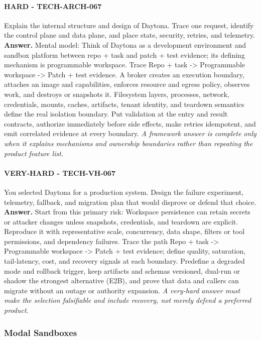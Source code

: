 \paragraph{HARD - TECH-ARCH-067} Explain the internal structure and design of Daytona. Trace one request, identify the control plane and data plane, and place state, security, retries, and telemetry.
\textbf{Answer.} Mental model: Think of Daytona as a development environment and sandbox platform between repo + task and patch + test evidence; its defining mechanism is programmable workspace. Trace Repo + task -> Programmable workspace -> Patch + test evidence. A broker creates an execution boundary, attaches an image and capabilities, enforces resource and egress policy, observes work, and destroys or snapshots it. Filesystem layers, processes, network, credentials, mounts, caches, artifacts, tenant identity, and teardown semantics define the real isolation boundary. Put validation at the entry and result contracts, authorize immediately before side effects, make retries idempotent, and emit correlated evidence at every boundary.
\textit{A framework answer is complete only when it explains mechanisms and ownership boundaries rather than repeating the product feature list.}
\paragraph{VERY-HARD - TECH-VH-067} You selected Daytona for a production system. Design the failure experiment, telemetry, fallback, and migration plan that would disprove or defend that choice.
\textbf{Answer.} Start from this primary risk: Workspace persistence can retain secrets or attacker changes unless snapshots, credentials, and teardown are explicit. Reproduce it with representative scale, concurrency, data shape, filters or tool permissions, and dependency failures. Trace the path Repo + task -> Programmable workspace -> Patch + test evidence; define quality, saturation, tail-latency, cost, and recovery signals at each boundary. Predefine a degraded mode and rollback trigger, keep artifacts and schemas versioned, dual-run or shadow the strongest alternative (E2B), and prove that data and callers can migrate without an outage or authority expansion.
\textit{A very-hard answer must make the selection falsifiable and include recovery, not merely defend a preferred product.}
\subsubsection*{Modal Sandboxes}
